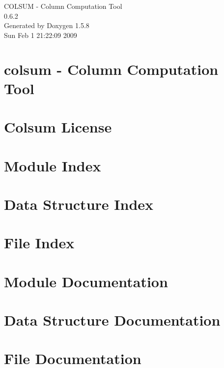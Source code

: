 \documentclass[a4paper]{article}
\begin{document}
\begin{titlepage}
\vspace*{7cm}
\begin{center}
{\Large COLSUM - Column Computation Tool \\[1ex]\large 0.6.2 }\\
\vspace*{1cm}
{\large Generated by Doxygen 1.5.8}\\
\vspace*{0.5cm}
{\small Sun Feb 1 21:22:09 2009}\\
\end{center}
\end{titlepage}
\tableofcontents
{}
\section{colsum - Column Computation Tool}
\label{index}\hypertarget{index}{}
\section{Colsum License}
\label{colsum_license}
\hypertarget{colsum_license}{}

\section{Module Index}

\section{Data Structure Index}

\section{File Index}

\section{Module Documentation}




\section{Data Structure Documentation}


\section{File Documentation}



\printindex
\end{document}
